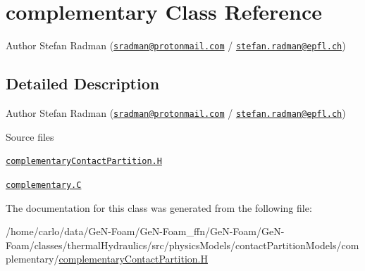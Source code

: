 \hypertarget{classFoam_1_1complementary}{}\section{complementary Class Reference}
\label{classFoam_1_1complementary}


Author Stefan Radman (\href{mailto:sradman@protonmail.com}{\tt sradman@protonmail.\+com} / \href{mailto:stefan.radman@epfl.ch}{\tt stefan.\+radman@epfl.\+ch})  




\subsection{Detailed Description}
Author Stefan Radman (\href{mailto:sradman@protonmail.com}{\tt sradman@protonmail.\+com} / \href{mailto:stefan.radman@epfl.ch}{\tt stefan.\+radman@epfl.\+ch}) 

\label{_Description}%
 \begin{DoxyParagraph}{Source files}

\begin{DoxyItemize}
\item \href{../../../home/carlo/data/GeN-Foam/GeN-Foam_ffn/GeN-Foam/GeN-Foam/classes/thermalHydraulics/src/physicsModels/contactPartitionModels/complementary/complementaryContactPartition.H}{\tt complementary\+Contact\+Partition.\+H} 
\item \href{../../../home/carlo/data/GeN-Foam/GeN-Foam_ffn/GeN-Foam/GeN-Foam/classes/thermalHydraulics/src/physicsModels/contactPartitionModels/complementary/complementary.C}{\tt complementary.\+C} 
\end{DoxyItemize}
\end{DoxyParagraph}


The documentation for this class was generated from the following file\+:\begin{DoxyCompactItemize}
\item 
/home/carlo/data/\+Ge\+N-\/\+Foam/\+Ge\+N-\/\+Foam\+\_\+ffn/\+Ge\+N-\/\+Foam/\+Ge\+N-\/\+Foam/classes/thermal\+Hydraulics/src/physics\+Models/contact\+Partition\+Models/complementary/\hyperlink{complementaryContactPartition_8H}{complementary\+Contact\+Partition.\+H}\end{DoxyCompactItemize}

